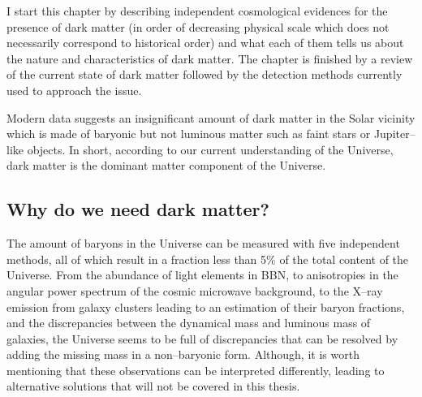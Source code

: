 \documentclass[paper=a4, fontsize=11pt]{scrartcl} %
\numberwithin{equation}{section} %
\numberwithin{figure}{section} %
\numberwithin{table}{section} %
\begin{document}
I start this chapter by describing independent cosmological evidences for the presence of dark matter (in order of decreasing physical scale which does not necessarily correspond to historical order) and what each of them tells us about the nature and characteristics of dark matter. The chapter is finished by a review of the current state of dark matter followed by the detection methods currently used to approach the issue.

Modern data suggests an insignificant amount of dark matter in the Solar vicinity which is made of baryonic but not luminous matter such as faint stars or Jupiter--like objects. In short, according to our current understanding of the Universe, dark matter is the dominant matter component of the Universe.


\subsection{Why do we need dark matter?}

The amount of baryons in the Universe can be measured with five independent methods, all of which result in a fraction less than 5\% of the total content of the Universe. From the abundance of light elements in BBN, to anisotropies in the angular power spectrum of the cosmic microwave background, to the X--ray emission from galaxy clusters leading to an estimation of their baryon fractions, and the discrepancies between the dynamical mass and luminous mass of galaxies, the Universe seems to be full of discrepancies that can be resolved by adding the missing mass in a non--baryonic form. Although, it is worth mentioning that these observations can be interpreted differently, leading to alternative solutions that will not be covered in this thesis.


\end{document}
